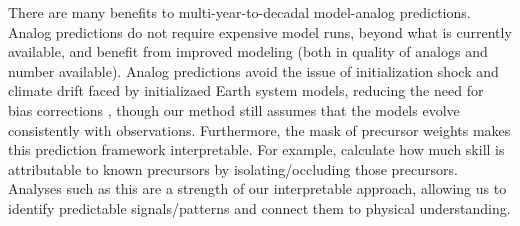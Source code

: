 There are many benefits to multi-year-to-decadal model-analog predictions.
Analog predictions do not require expensive model runs, beyond what is currently available, and benefit from improved modeling (both in quality of analogs and number available).
Analog predictions avoid the issue of initialization shock and climate drift faced by initializaed Earth system models, reducing the need for bias corrections \cite{meehl2021, meehl2022}, though our method still assumes that the models evolve consistently with observations.
Furthermore, the mask of precursor weights makes this prediction framework interpretable.
For example,  calculate how much skill is attributable to known precursors by isolating/occluding those precursors.
Analyses such as this are a strength of our interpretable approach, allowing us to identify predictable signals/patterns and connect them to physical understanding.
